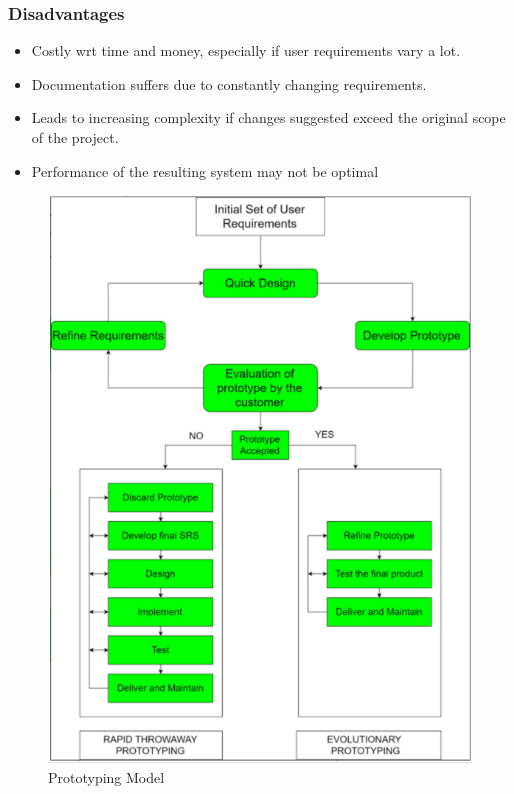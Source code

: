 \documentclass{article}
\begin{document}
\subsubsection{Disadvantages}
\begin{itemize}
    \item Costly wrt time and money, especially if user requirements vary a lot. 
    
    \item Documentation suffers due to constantly changing requirements.
    
    \item Leads to increasing complexity if changes suggested exceed the original scope of the project. 
    
    \item Performance of the resulting system may not be optimal
\end{itemize}
\begin{figure}[!ht]
    \centering
    \includegraphics[scale=0.5]{se3.png}
    \caption{Prototyping Model}
    \label{fig:my_label_3}
\end{figure}
\end{document}
